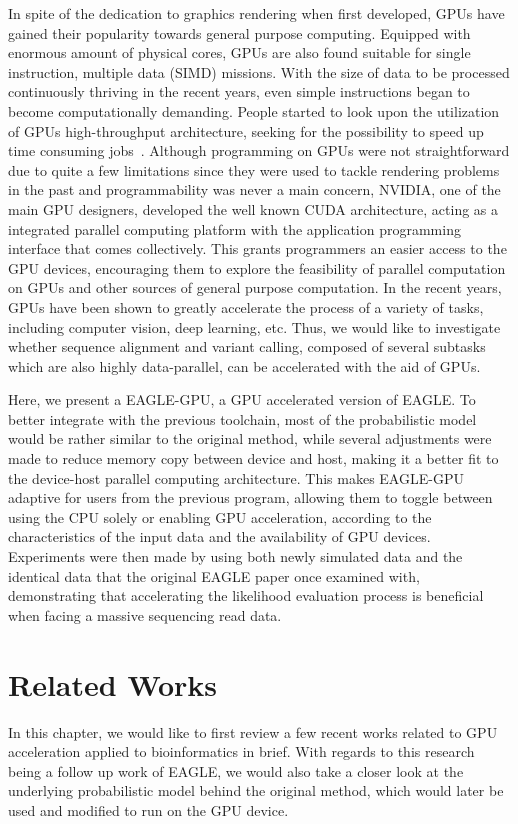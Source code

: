\documentclass{PHlab-thesis}
\begin{document}
In spite of the dedication to graphics rendering when first developed, GPUs have gained their popularity towards general purpose computing. Equipped with enormous amount of physical cores, GPUs are also found suitable for single instruction, multiple data (SIMD) missions. With the size of data to be processed continuously thriving in the recent years, even simple instructions began to become computationally demanding. People started to look upon the utilization of GPUs high-throughput architecture, seeking for the possibility to speed up time consuming jobs~\cite{owens2008gpu,nickolls2010gpu}. Although programming on GPUs were not straightforward due to quite a few limitations since they were used to tackle rendering problems in the past and programmability was never a main concern, NVIDIA, one of the main GPU designers, developed the well known CUDA architecture, acting as a integrated parallel computing platform with the application programming interface that comes collectively. This grants programmers an easier access to the GPU devices, encouraging them to explore the feasibility of parallel computation on GPUs and other sources of general purpose computation. In the recent years, GPUs have been shown to greatly accelerate the process of a variety of tasks, including computer vision, deep learning, etc. Thus, we would like to investigate whether sequence alignment and variant calling, composed of several subtasks which are also highly data-parallel, can be accelerated with the aid of GPUs.

Here, we present a EAGLE-GPU, a GPU accelerated version of EAGLE. To better integrate with the previous toolchain, most of the probabilistic model would be rather similar to the original method, while several adjustments were made to reduce memory copy between device and host, making it a better fit to the device-host parallel computing architecture. This makes EAGLE-GPU adaptive for users from the previous program, allowing them to toggle between using the CPU solely or enabling GPU acceleration, according to the characteristics of the input data and the availability of GPU devices. Experiments were then made by using both newly simulated data and the identical data that the original EAGLE paper once examined with, demonstrating that accelerating the likelihood evaluation process is beneficial when facing a massive sequencing read data.

\chapter{Related Works}
In this chapter, we would like to first review a few recent works related to GPU acceleration applied to bioinformatics in brief. With regards to this research being a follow up work of EAGLE, we would also take a closer look at the underlying probabilistic model behind the original method, which would later be used and modified to run on the GPU device.
\end{document}
